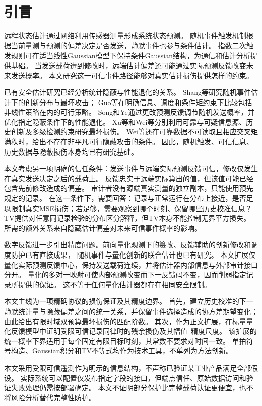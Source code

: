 \section{引言}
远程状态估计通过网络利用传感器测量形成系统状态预测。
随机事件触发机制根据当前量测与预测的偏差决定是否发送，静默事件也参与条件估计。
指数二次触发规则可在适当线性Gaussian模型下保持条件Gaussian结构，为通信和估计分析提供基础\cite{han2015}。
当发送载荷遭到修改时，远端估计偏差还可能通过实际预测反馈改变未来发送概率。
本文研究这一可信事件路径能够对真实估计损伤提供怎样的约束。

已有安全估计研究已经分析统计隐蔽与性能退化的关系\cite{bai2017,shang2022}。
Shang等研究随机事件估计下的创新分布与最坏攻击\cite{shang2022}；
Guo等在明确信息、调度和条件矩约束下比较包括非线性策略在内的可行策略\cite{guo2025}。
Song和Ye通过更改预测反馈调节随机发送概率，并优化指定隐蔽条件下的性能退化\cite{song2022}。
Xu等和Wei等分别利用可靠与可疑信息源、历史创新及多级检测约束研究最坏损伤\cite{xu2023,wei2026}。
Wei等还在可靠数据不可读取且相应交叉矩满秩时，给出不存在非平凡可行隐蔽攻击的条件。
因此，随机触发、可信信息、历史数据与隐蔽损伤本身均已有研究基础。

本文考虑另一项明确的信任条件：发送事件与远端实际预测反馈可信，修改仅发生在真实发送决定之后的载荷上。
反馈忠实于远端实际算出的值，但该值可能已经包含先前修改造成的偏差。
审计者没有源端真实测量的独立副本，只能使用预先规定的记录。
在这一条件下，需要回答：记录与正常运行在分布上接近，是否足以限制真实MSE损伤；若足够，需要观察到哪个时刻、保留哪些历史校准信息？
TV提供对任意同记录检验的分布区分解释，但TV本身不能控制无界平方损失。
所需的额外关系来自隐藏估计偏差对未来可信事件概率的影响。

数字反馈进一步引出精度问题。前向量化观测下的篡改、反馈辅助的创新修改和调度防护已有直接成果\cite{li2026,li2025}，
随机事件与量化创新的联合估计也已有研究\cite{shen2025}。
本文扩展仅量化实际预测反馈中心，保持发送载荷连续，并将估计器内部信息与外部审计接口分开。
量化的多对一映射可使内部预测改变而下一反馈码不变，因而削弱指定记录所提供的保证。
这不等于任何量化估计器都存在相同安全限制。

本文主线为一项精确协议的损伤保证及其精度边界。
首先，建立历史校准的下一静默统计量与隐藏偏差之间的统一关系，并保留事件选择造成的协方差期望变化；
由此给出有限时域双预算最坏损伤的匹配阶数。
其次，作为正文扩展，在标量量化反馈模型中证明受限可信记录同律时的残余损伤及其幅值--精度尺度。
该扩展的统一概率下界适用于每个固定有限目标时刻，其常数不要求对时间一致。
单拍符号构造、Gaussian积分和TV不等式均作为技术工具，不单列为方法创新。

本文采用受限可信遥测作为明示的信息结构，不声称已验证某工业产品满足全部假设。
实际系统可以配置仅发布指定字段的接口\cite{opcdata}，但端点信任、原始数据访问和验证失败处理仍需按部署确定。
本文不证明部分保护比完整载荷认证更便宜，也不将风险分析替代完整性防护。
